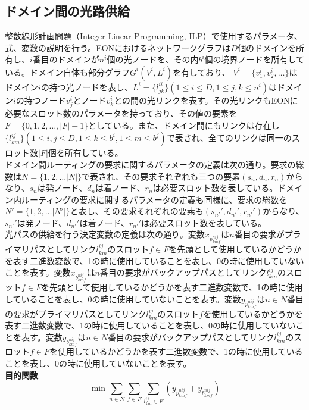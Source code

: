 \documentclass[a4j,twocolumn,fleqn]{jarticle}
\begin{document}
\subsection{ドメイン間の光路供給}
整数線形計画問題（Integer Linear Programming, ILP）で使用するパラメータ、式、変数の説明を行う。EONにおけるネットワークグラフは$D$個のドメインを所有し、$i$番目のドメインが$n^i$個の光ノードを、その内$b^i$個の境界ノードを所有している。ドメイン自体も部分グラフ$G^i (V^i ,L^i)$を有しており、 $V^i = \{v^i_1,v^i_2, \dots \} $はドメイン$i$の持つ光ノードを表し、$L^i = \{l^{ii}_{jk}\}(1\leq i \leq D,1\leq j,k \leq n^i)$はドメイン$i$の持つノード$v^i_j$とノード$v^i_k$との間の光リンクを表す。その光リンクもEONに必要なスロット数のパラメータを持っており、その値の要素を$F=\{0,1,2,\dots ,|F|-1\}$としている。また、ドメイン間にもリンクは存在し$\{l^{ij}_{km}\}(1\leq i,j\leq D,1\leq k\leq b^i,1\leq m \leq b^j)$で表され、全てのリンクは同一のスロット数$|F|$個を所有している。\\
ドメイン間ルーティングの要求に関するパラメータの定義は次の通り。要求の総数は$N=\{1,2,\dots |N|\}$で表され、その要求それぞれも三つの要素$(s_n,d_n,r_n)$からなり、$s_n$は発ノード、$d_n$は着ノード、$r_n$は必要スロット数を表している。ドメイン内ルーティングの要求に関するパラメータの定義も同様に、要求の総数を$N'=\{1,2,\dots |N'|\}$と表し、その要求それぞれの要素も$(s_{n'}',d_{n'}',r_{n'}')$からなり、$s_{n'}'$は発ノード、$d_{n'}'$は着ノード、$r_{n'}'$は必要スロット数を表している。\\
光パスの供給を行う決定変数の定義は次の通り。変数$x_{p^{nij}_{kmf}}$は$n$番目の要求がプライマリパスとしてリンク$l^{ij}_{km}$のスロット$f \in F$を先頭として使用しているかどうかを表す二進数変数で、1の時に使用していることを表し、0の時に使用していないことを表す。変数$x_{b^{nij}_{kmf}}$は$n$番目の要求がバックアップパスとしてリンク$l^{ij}_{km}$のスロット$f\in F$を先頭として使用しているかどうかを表す二進数変数で、1の時に使用していることを表し、0の時に使用していないことを表す。変数$y_{p^{nij}_{kmf}}$は$n\in N$番目の要求がプライマリパスとしてリンク$l^{ij}_{km}$のスロット$f$を使用しているかどうかを表す二進数変数で、1の時に使用していることを表し、0の時に使用していないことを表す。変数$y_{b^{nij}_{kmf}}$は$n\in N$番目の要求がバックアップパスとしてリンク$l^{ij}_{km}$のスロット$f\in F$を使用しているかどうかを表す二進数変数で、1の時に使用していることを表し、0の時に使用していないことを表す。\\
{\large \bf 目的関数}
\begin{equation}%
\displaystyle \min \sum_{n \in N} \sum_{f \in F} \sum_{l^{ij}_{km} \in E}(y_{p^{nij}_{kmf}} + y_{b^{nij}_{kmf}})
\end{equation}
\end{document}
